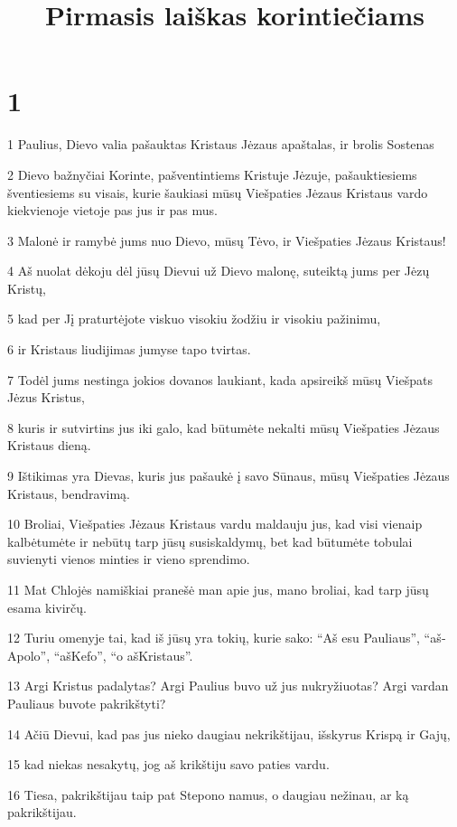 

\title{Pirmasis laiškas korintiečiams}

\chapter{1}


\par 1 Paulius, Dievo valia pašauktas Kristaus Jėzaus apaštalas, ir brolis Sostenas­ 
\par 2 Dievo bažnyčiai Korinte, pašventintiems Kristuje Jėzuje, pašauktiesiems šventiesiems su visais, kurie šaukiasi mūsų Viešpaties Jėzaus Kristaus vardo kiekvienoje vietoje pas jus ir pas mus. 
\par 3 Malonė ir ramybė jums nuo Dievo, mūsų Tėvo, ir Viešpaties Jėzaus Kristaus! 
\par 4 Aš nuolat dėkoju dėl jūsų Dievui už Dievo malonę, suteiktą jums per Jėzų Kristų, 
\par 5 kad per Jį praturtėjote viskuo­ visokiu žodžiu ir visokiu pažinimu,­ 
\par 6 ir Kristaus liudijimas jumyse tapo tvirtas. 
\par 7 Todėl jums nestinga jokios dovanos laukiant, kada apsireikš mūsų Viešpats Jėzus Kristus, 
\par 8 kuris ir sutvirtins jus iki galo, kad būtumėte nekalti mūsų Viešpaties Jėzaus Kristaus dieną. 
\par 9 Ištikimas yra Dievas, kuris jus pašaukė į savo Sūnaus, mūsų Viešpaties Jėzaus Kristaus, bendravimą. 
\par 10 Broliai, Viešpaties Jėzaus Kristaus vardu maldauju jus, kad visi vienaip kalbėtumėte ir nebūtų tarp jūsų susiskaldymų, bet kad būtumėte tobulai suvienyti vienos minties ir vieno sprendimo. 
\par 11 Mat Chlojės namiškiai pranešė man apie jus, mano broliai, kad tarp jūsų esama kivirčų. 
\par 12 Turiu omenyje tai, kad iš jūsų yra tokių, kurie sako: “Aš esu Pauliaus”, “aš­Apolo”, “aš­Kefo”, “o aš­Kristaus”. 
\par 13 Argi Kristus padalytas? Argi Paulius buvo už jus nukryžiuotas? Argi vardan Pauliaus buvote pakrikštyti? 
\par 14 Ačiū Dievui, kad pas jus nieko daugiau nekrikštijau, išskyrus Krispą ir Gajų, 
\par 15 kad niekas nesakytų, jog aš krikštiju savo paties vardu. 
\par 16 Tiesa, pakrikštijau taip pat Stepono namus, o daugiau nežinau, ar ką pakrikštijau. 
